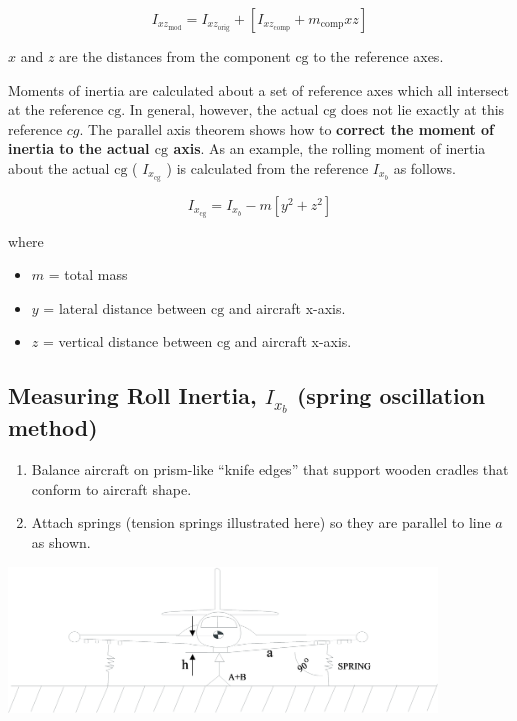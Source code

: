 \documentclass[
]{book}
\providecommand{\tightlist}{%
  \setlength{\itemsep}{0pt}\setlength{\parskip}{0pt}}
\begin{document}
\[ I_{xz_{\text{mod}}} = I_{xz_{\text{orig}}} + \left[ I_{xz_{\text{comp}}} + m_{\text{comp}} xz \right] \]

\(x\) and \(z\) are the distances from the component \(\mathrm{cg}\) to the reference axes.

Moments of inertia are calculated about a set of reference axes which all intersect at the reference \(\mathrm{cg}\). In general, however, the actual \(\mathrm{cg}\) does not lie exactly at this reference \(cg\). The parallel axis theorem shows how to \textbf{correct the moment of inertia to the actual \(\mathrm{cg}\) axis}. As an example, the rolling moment of inertia about the actual \(\mathrm{cg}\) ( \(I_{x_{\mathrm{cg}}}\) ) is calculated from the reference \(I_{x_b}\) as follows.

\[ I_{x_{\mathrm{cg}}} = I_{x_b} - m \left[ y^2 + z^2 \right] \]

where

\begin{itemize}
\tightlist
\item
  \(m\) = total mass
\item
  \(y\) = lateral distance between \(\mathrm{cg}\) and aircraft x-axis.
\item
  \(z\) = vertical distance between \(\mathrm{cg}\) and aircraft x-axis.
\end{itemize}

\hypertarget{measuring-roll-inertia-i_x_b-spring-oscillation-method}{%
\subsection{\texorpdfstring{Measuring Roll Inertia, \(I_{x_b}\) (spring oscillation method)}{Measuring Roll Inertia, I\_\{x\_b\} (spring oscillation method)}}\label{measuring-roll-inertia-i_x_b-spring-oscillation-method}}

\begin{enumerate}
\def\labelenumi{\arabic{enumi}.}
\tightlist
\item
  Balance aircraft on prism-like ``knife edges'' that support wooden cradles that conform to aircraft shape.
\item
  Attach springs (tension springs illustrated here) so they are parallel to line \(a\) as shown.
\end{enumerate}

\includegraphics[width=4.47917in,height=1.52847in]{media/07/image24.svg}~
\end{document}
